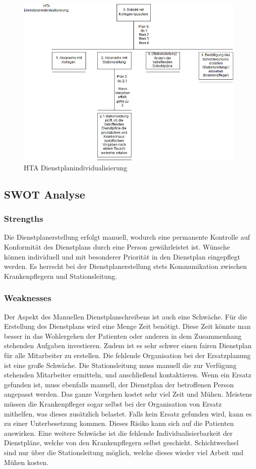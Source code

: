 \documentclass[10pt,a4paper]{article}
\begin{document}
\begin{figure}[h]

\includegraphics[scale=0.4]{Bilder/Individualisierung.jpg}{\centering}
\caption{HTA Dienstplanindividualisierung}

\end{figure}
\subsection{SWOT Analyse}
\subsubsection{Strengths}
Die Dienstplanerstellung erfolgt manuell, wodurch eine permanente Kontrolle auf Konformität des Dienstplans durch eine Person gewährleistet ist.  Wünsche können individuell und mit besonderer Priorität in den Dienstplan eingepflegt werden. Es herrscht bei der Dienstplanerstellung stets Kommunikation zwischen Krankenpflegern und Stationsleitung.
\subsubsection{Weaknesses}
Der Aspekt des Manuellen Dienstplanschreibens ist auch eine Schwäche. Für die Erstellung des Dienstplans wird eine Menge Zeit benötigt. Diese Zeit könnte man besser in das Wohlergehen der Patienten oder anderen in dem Zusammenhang stehenden Aufgaben investieren. Zudem ist es sehr schwer einen fairen Dienstplan für alle Mitarbeiter zu erstellen.
Die fehlende Organisation bei der Ersatzplanung ist eine große Schwäche. Die Stationsleitung muss manuell die zur Verfügung stehenden Mitarbeiter ermitteln, und anschließend kontaktieren. Wenn ein Ersatz gefunden ist, muss ebenfalls manuell, der Dienstplan der betroffenen Person angepasst werden. Das ganze Vorgehen kostet sehr viel Zeit und Mühen. Meistens müssen die Krankenpfleger sogar selbst bei der Organisation von Ersatz mithelfen, was dieses zusätzlich belastet. Falls kein Ersatz gefunden wird, kann es zu einer Unterbesetzung kommen. Dieses Risiko kann sich auf die Patienten auswirken.
Eine weitere Schwäche ist die fehlende Individualisierbarkeit der Dienstpläne, welche von den Krankenpflegern selbst geschieht. Schichtwechsel sind nur über die Stationsleitung möglich, welche dieses wieder viel Arbeit und Mühen kosten.
\end{document}
